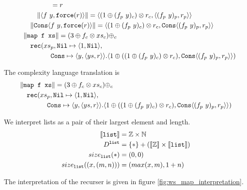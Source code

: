 \begin{figure}
\[\begin{split}
    &\qquad\quad\quad = r \\
    &\qquad \|\langle f\ y, \texttt{force}(r)\rangle\| = \langle (1 \oplus (f_p\ y)_c) \otimes r_c, \langle (f_p\ y)_p, r_p \rangle \rangle \\
    &\quad\|\texttt{Cons}\langle f\ y, \texttt{force}(r)\rangle \| = \langle (1 \oplus (f_p\ y)_c) \otimes r_c, \texttt{Cons} \langle (f_p\ y)_p, r_p \rangle \rangle \\
    &\|\texttt{map f xs}\| = (3 \oplus f_c \otimes xs_c) \oplus_c \\
    &\quad \texttt{rec}(xs_p, \texttt{Nil}\mapsto \langle 1, \texttt{Nil}\rangle, \\
    &\qquad\quad\quad \texttt{Cons} \mapsto \langle y, \langle ys, r \rangle \rangle. \langle 1 \oplus ((1 \oplus (f_p\ y)_c) \otimes r_c), \texttt{Cons} \langle (f_p\ y)_p, r_p \rangle \rangle)
  \end{split}\]
\end{figure}

The complexity language translation is
\begin{equation*}
\begin{split}
    &\|\texttt{map f xs}\| = (3 \oplus f_c \otimes xs_c) \oplus_c \\
    &\quad \texttt{rec}(xs_p, \texttt{Nil}\mapsto \langle 1, \texttt{Nil}\rangle, \\
    &\qquad\quad\quad \texttt{Cons} \mapsto \langle y, \langle ys, r \rangle \rangle. \langle 1 \oplus ((1 \oplus (f_p\ y)_c) \otimes r_c), \texttt{Cons} \langle (f_p\ y)_p, r_p \rangle \rangle)
\end{split}
\end{equation*}


We interpret lists as a pair of their largest element and length.
\begin{align*}
  \llbracket \texttt{list} \rrbracket &= \mathbb{Z} \times \mathbb{N} \\
  D^{\texttt{list}} &= \{*\} + (\llbracket \mathbb{Z} \rrbracket \times \llbracket \texttt{list} \rrbracket) \\
  size_{\texttt{list}}(*) &= (0, 0) \\
  size_{\texttt{list}}((x, (m, n))) &= (max(x, m), 1 + n)
\end{align*}

The interpretation of the recurser is given in figure \ref{fig:ws_map_interpretation}.

